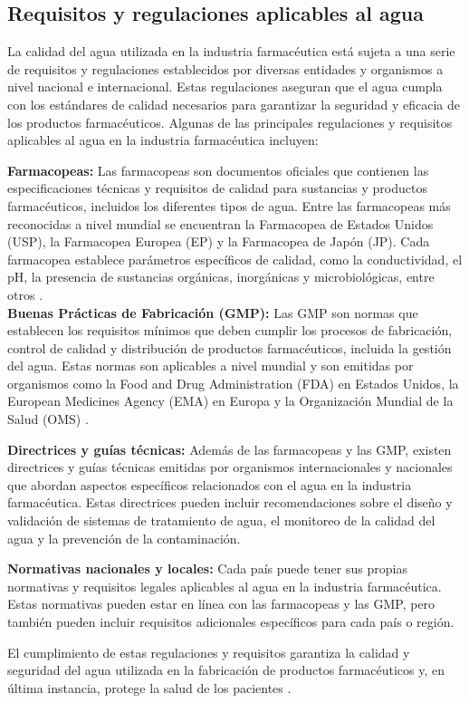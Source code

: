 \subsection{ Requisitos y regulaciones aplicables al agua}

La calidad del agua utilizada en la industria farmacéutica está sujeta a una serie de requisitos y regulaciones establecidos por diversas entidades y organismos a nivel nacional e internacional. Estas regulaciones aseguran que el agua cumpla con los estándares de calidad necesarios para garantizar la seguridad y eficacia de los productos farmacéuticos. Algunas de las principales regulaciones y requisitos aplicables al agua en la industria farmacéutica incluyen:

\textbf{Farmacopeas:} Las farmacopeas son documentos oficiales que contienen las especificaciones técnicas y
 requisitos de calidad para sustancias y productos farmacéuticos, incluidos los diferentes 
 tipos de agua. Entre las farmacopeas más reconocidas a nivel mundial se encuentran la 
 Farmacopea de Estados Unidos (USP), la Farmacopea Europea (EP) y la Farmacopea de Japón 
 (JP). Cada farmacopea establece parámetros específicos de calidad, como la conductividad, 
 el pH, la presencia de sustancias orgánicas, inorgánicas y microbiológicas, entre otros \cite{farm.veronicamartinezFARMACOPEAS2005}. \\

\textbf{ Buenas Prácticas de Fabricación (GMP):} Las GMP son normas que establecen los requisitos mínimos que deben cumplir
los procesos de fabricación, control de calidad y distribución de productos farmacéuticos, incluida la gestión del agua.
Estas normas son aplicables a nivel mundial y son emitidas por organismos como la Food and Drug Administration (FDA) en 
Estados Unidos, la European Medicines Agency (EMA) en Europa y la Organización Mundial de la Salud (OMS) \cite{ispeGoodManufacturingPractice}.

\textbf{ Directrices y guías técnicas:} Además de las farmacopeas y las GMP, existen directrices y guías técnicas 
emitidas por organismos internacionales y nacionales que abordan aspectos específicos relacionados con el agua en 
la industria farmacéutica. Estas directrices pueden incluir recomendaciones sobre el diseño y validación de sistemas
 de tratamiento de agua, el monitoreo de la calidad del agua y la prevención de la contaminación.

\textbf{ Normativas nacionales y locales:} Cada país puede tener sus propias normativas y requisitos legales 
aplicables al agua en la industria farmacéutica. Estas normativas pueden estar en línea con las farmacopeas y
 las GMP, pero también pueden incluir requisitos adicionales específicos para cada país o región.


El cumplimiento de estas regulaciones y requisitos garantiza la calidad y seguridad del agua utilizada en la fabricación de productos farmacéuticos y, en última instancia, protege la salud de los pacientes \cite{juanantoniodelacuerdaImportanciaAguaIndustria2021}.
